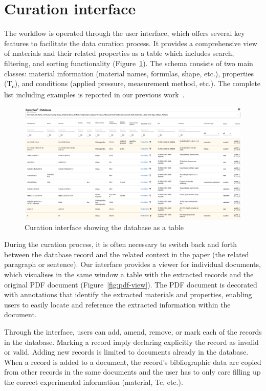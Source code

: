 \documentclass[a4paper]{article}
\begin{document}
\section{Curation interface}
\label{sec:user-interface}

The workflow is operated through the user interface, which offers several key features to facilitate the data curation process.
It provides a comprehensive view of materials and their related properties as a table which includes search, filtering, and sorting functionality (Figure~\ref{fig:curation-interface-database}). 
The schema consists of two main classes: material information (material names, formulas, shape, etc.), properties (T\textsubscript{c}), and conditions (applied pressure, measurement method, etc.). The complete list including examples is reported in our previous work~\cite{lfoppiano2023automatic}.

\begin{figure}[ht]
  \centering
  \includegraphics[width=1\textwidth]{images/supercon-curation-database} 
  \caption{Curation interface showing the database as a table}
  \label{fig:curation-interface-database}
\end{figure}


During the curation process, it is often necessary to switch back and forth between the database record and the related context in the paper (the related paragraph or sentence). 
Our interface provides a viewer for individual documents, which visualises in the same window a table with the extracted records and the original PDF document (Figure~\ref{fig:pdf-view}). 
The PDF document is decorated with annotations that identify the extracted materials and properties, enabling users to easily locate and reference the extracted information within the document.

Through the interface, users can add, amend, remove, or mark each of the records in the database.
Marking a record imply declaring explicitly the record as invalid or valid.
Adding new records is limited to documents already in the database. 
When a record is added to a document, the record's bibliographic data are copied from other records in the same documents and the user has to only care filling up the correct experimental information (material, Tc, etc.).
\end{document}
